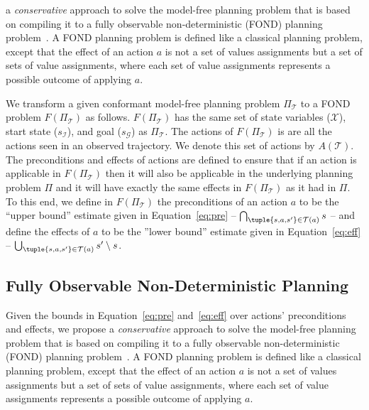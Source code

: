 a {\em conservative} approach to solve the model-free planning problem that is based on compiling it to a fully observable non-deterministic (FOND) planning problem~\cite{daniele1999strong,muise2012improved}. 
A FOND planning problem is defined like a classical planning problem, except that the effect of an action $a$
is not a set of values assignments but a set of sets of value assignments, where each set of value assignments represents a possible outcome of applying $a$.  


We transform a given conformant model-free planning problem $\Pi_\mathcal{T}$ to a FOND problem $F(\Pi_\mathcal{T})$ as follows. $F(\Pi_\mathcal{T})$ has the same set of state variables ($\mathcal{X}$), start state ($s_\mathcal{I}$), and goal ($s_\mathcal{G}$) as $\Pi_\mathcal{T}$. The actions of $F(\Pi_\mathcal{T})$ is are all the actions seen in an observed trajectory. We denote this set of actions by $A(\mathcal{T})$. 
The preconditions and effects of actions are defined to ensure that 
if an action is applicable in $F(\Pi_\mathcal{T})$ then it will also be applicable in the underlying planning problem $\Pi$ and it will have exactly the same effects in $F(\Pi_\mathcal{T})$ as it had in $\Pi$. To this end, we define in $F(\Pi_\mathcal{T})$ the preconditions of an action $a$ to be the ``upper bound'' estimate given in Equation~\ref{eq:pre} -- $\bigcap_{\tuple{s, a, s'}\in \mathcal{T}(a)} s$ -- 
and define the effects of $a$ to be the ''lower bound'' estimate given in 
Equation~\ref{eq:eff} -- $\bigcup_{\tuple{s,a,s'}\in\mathcal{T}(a)} s'\setminus s$. 



\subsection{Fully Observable Non-Deterministic Planning}
Given the bounds in Equation~\ref{eq:pre} and~\ref{eq:eff} over actions' preconditions and effects, we propose a {\em conservative} approach to solve the model-free planning problem that is based on compiling it to a fully observable non-deterministic (FOND) planning problem~\cite{daniele1999strong,muise2012improved}. 
A FOND planning problem is defined like a classical planning problem, except that the effect of an action $a$
is not a set of values assignments but a set of sets of value assignments, where each set of value assignments represents a possible outcome of applying $a$.  


